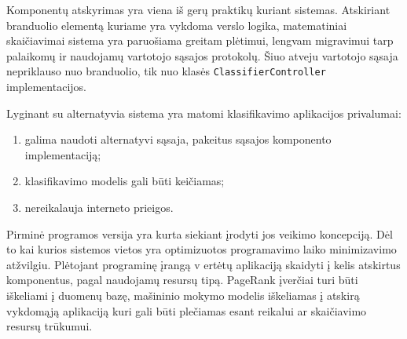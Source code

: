 Komponentų atskyrimas yra viena iš gerų praktikų kuriant sistemas. Atskiriant branduolio elementą kuriame yra vykdoma verslo logika, matematiniai skaičiavimai sistema yra paruošiama greitam plėtimui, lengvam migravimui tarp palaikomų ir naudojamų vartotojo sąsajos protokolų. Šiuo atveju vartotojo sąsaja nepriklauso nuo branduolio, tik nuo klasės \texttt{ClassifierController} implementacijos.

Lyginant su alternatyvia sistema \cite{gapi} yra matomi klasifikavimo aplikacijos privalumai:
 \begin{enumerate}
    \item galima naudoti alternatyvi sąsaja, pakeitus sąsajos komponento implementaciją;
    \item klasifikavimo modelis gali būti keičiamas;
    \item nereikalauja interneto prieigos.
 \end{enumerate}

Pirminė programos versija yra kurta siekiant įrodyti jos veikimo koncepciją. Dėl to kai kurios sistemos vietos yra optimizuotos programavimo laiko minimizavimo atžvilgiu. Plėtojant programinę įrangą v ertėtų aplikaciją skaidyti į kelis atskirtus komponentus, pagal naudojamų resursų tipą. PageRank įverčiai turi būti iškeliami į duomenų bazę, mašininio mokymo modelis iškeliamas į atskirą vykdomąją aplikaciją kuri gali būti plečiamas esant reikalui ar skaičiavimo resursų trūkumui.